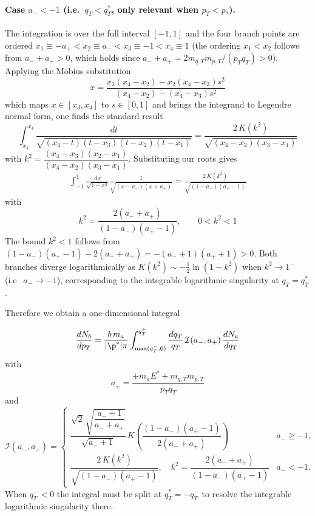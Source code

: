\paragraph{Case $a_- < -1$ (i.e.\ $q_T < q_T^*$, only relevant when $p_T < p_*$).}
The integration is over the full interval $[-1,1]$ and the four branch points are ordered $x_1 \equiv -a_+ < x_2 \equiv a_- < x_3 \equiv -1 < x_4 \equiv 1$ (the ordering $x_1<x_2$ follows from $a_-+a_+>0$, which holds since $a_-+a_+ = 2m_{q,T}m_{p,T}/(p_T q_T)>0$). Applying the Möbius substitution
\begin{equation}
    x = \frac{x_3(x_4-x_2) - x_2(x_4-x_3)s^2}{(x_4-x_2)-(x_4-x_3)s^2}
\end{equation}
which maps $x\in[x_3,x_4]$ to $s\in[0,1]$ and brings the integrand to Legendre normal form, one finds the standard result
\begin{equation}
\int_{x_3}^{x_4} \frac{dt}{\sqrt{(x_4-t)(t-x_3)(t-x_2)(t-x_1)}} = \frac{2\,K(k^2)}{\sqrt{(x_4-x_2)(x_3-x_1)}}
\end{equation}
with $k^2 = \dfrac{(x_4-x_3)(x_2-x_1)}{(x_4-x_2)(x_3-x_1)}$. Substituting our roots gives
\begin{align}
\int_{-1}^1 \frac{dx}{\sqrt{1-x^2}}   \frac{1}{\sqrt{(x -a_-)(x+a_+)}}
= \frac{2\,K(k^2)}{\sqrt{(1-a_-)(a_+-1)}}
\end{align}
with
\begin{equation}
    k^2 = \frac{2(a_-+a_+)}{(1-a_-)(a_+-1)}, \qquad 0 < k^2 < 1
\end{equation}
The bound $k^2<1$ follows from $(1-a_-)(a_+-1) - 2(a_-+a_+) = -(a_-+1)(a_++1) > 0$.
Both branches diverge logarithmically as $K(k^2)\sim -\tfrac{1}{2}\ln(1-k^2)$ when $k^2\to 1^-$ (i.e.\ $a_-\to -1$), corresponding to the integrable logarithmic singularity at $q_T = q_T^*$.

Therefore we obtain a one-dimensional integral

\begin{equation}
		\frac{dN_b}{dp_T} =\frac{b\, m_a}{|\p^*|\pi}
	\int_{\text{max}(q_T^-,0)}^{q_T^+} \frac{ dq_T}{q_T}\, \mathcal{I}(a_-,a_+)\,\frac{dN_a}{ dq_T}
\end{equation}
with
\begin{equation}
    a_{\pm}= \frac{\pm m_a E^* +m_{q,T} m_{p,T}}{p_T q_T}
\end{equation}
and
\begin{equation}
\mathcal{I}(a_-,a_+) = \begin{cases}
\dfrac{\sqrt{2}\,\sqrt{\dfrac{a_-+1}{a_-+a_+}}}{\sqrt{a_-+1}}\,K\!\left(\dfrac{(1-a_-)(a_+-1)}{2(a_-+a_+)}\right) & a_- \geq -1,\\[10pt]
\dfrac{2\,K(k^2)}{\sqrt{(1-a_-)(a_+-1)}},\quad k^2 = \dfrac{2(a_-+a_+)}{(1-a_-)(a_+-1)} & a_- < -1.
\end{cases}
\end{equation}
When $q_T^- < 0$ the integral must be split at $q_T^*=-q_T^-$ to resolve the integrable logarithmic singularity there.



